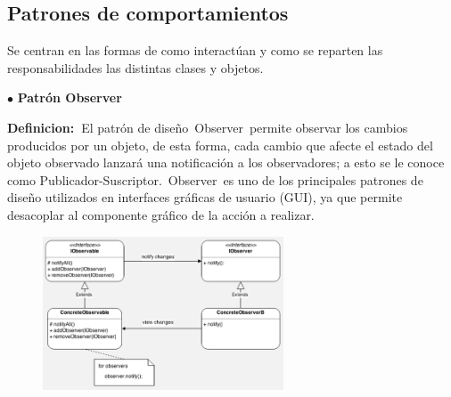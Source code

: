 \documentclass[12pt]{article}
\begin{document}
\begin{multicols}{2}
\vspace{\baselineskip}

\vspace{\baselineskip}
\section{Patrones de comportamientos}
{\fontsize{9pt}{10.8pt}\selectfont Se centran en las formas de como interactúan y como se reparten las responsabilidades las distintas clases y objetos.\par}\par

{\fontsize{9pt}{10.8pt}\selectfont $\bullet$ \tab \textbf{ Patrón Observer}\par}\par

{\fontsize{9pt}{10.8pt}\selectfont \textbf{Definicion: }El patrón de diseño Observer permite observar los cambios producidos por un objeto, de esta forma, cada cambio que afecte el estado del objeto observado lanzará una notificación a los observadores; a esto se le conoce como Publicador-Suscriptor. Observer es uno de los principales patrones de diseño utilizados en interfaces gráficas de usuario (GUI), ya que permite desacoplar al componente gráfico de la acción a realizar. \par}\par




\begin{figure}[H]
	\begin{Center}
		\includegraphics[width=2.81in,height=1.8in]{./media/image11.png}
	\end{Center}
\end{figure}



{\fontsize{10pt}{12.0pt}\selectfont \par}\par


\end{multicols}
\end{document}

